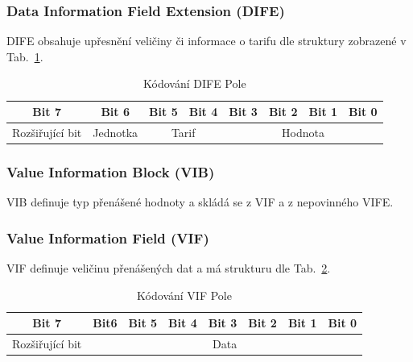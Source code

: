 \vspace{-10pt}
\subsubsection{Data Information Field Extension (DIFE)}
DIFE obsahuje upřesnění veličiny či informace o tarifu dle struktury zobrazené v Tab.~\ref{KodovaniDIFE}.

\vspace{-10pt}
\begin{table}[!ht]
\centering
\caption{Kódování DIFE Pole}
\label{KodovaniDIFE}
\begin{tabular}{|c|c|c|c|c|c|c|c|}
\hline \hline
\textbf{Bit 7}  & \textbf{Bit 6} & \textbf{Bit 5} & \textbf{Bit 4} & \textbf{Bit 3} & \textbf{Bit 2} & \textbf{Bit 1} & \textbf{Bit 0} \\ \hline 
Rozšiřující bit & Jednotka       & \multicolumn{2}{c|}{Tarif}      & \multicolumn{4}{c|}{Hodnota}                                      \\ \hline \hline
\end{tabular}
\end{table}

\vspace{-15pt}
\subsubsection{Value Information Block (VIB)}
VIB definuje typ přenášené hodnoty a skládá se z VIF a z nepovinného VIFE.

\vspace{-5pt}
\subsubsection{Value Information Field (VIF)}
VIF definuje veličinu přenášených dat a má strukturu dle Tab.~\ref{KodovaniVIFu}.

\begin{table}[!ht]
\centering
\caption{Kódování VIF Pole}
\label{KodovaniVIFu}
\begin{tabular}{|c|c|c|c|c|c|c|c|}
\hline \hline
\textbf{Bit 7}  & \textbf{Bit6} & \textbf{Bit 5} & \textbf{Bit 4} & \textbf{Bit 3} & \textbf{Bit 2} & \textbf{Bit 1} & \textbf{Bit 0} \\ \hline 
Rozšiřující bit & \multicolumn{7}{c|}{Data}                                                                                           \\ \hline \hline
\end{tabular}
\end{table}

